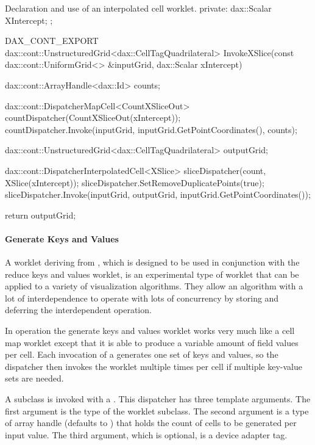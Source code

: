 \begin{daxexample}{Declaration and use of an interpolated cell worklet.}
{private:
  dax::Scalar XIntercept;
};

DAX_CONT_EXPORT
dax::cont::UnstructuredGrid<dax::CellTagQuadrilateral>
InvokeXSlice(const dax::cont::UniformGrid<> &inputGrid, dax::Scalar xIntercept)
{
  dax::cont::ArrayHandle<dax::Id> counts;

  dax::cont::DispatcherMapCell<CountXSliceOut> countDispatcher(CountXSliceOut(xIntercept));
  countDispatcher.Invoke(inputGrid, inputGrid.GetPointCoordinates(), counts);

  dax::cont::UnstructuredGrid<dax::CellTagQuadrilateral> outputGrid;

  dax::cont::DispatcherInterpolatedCell<XSlice> sliceDispatcher(count, XSlice(xIntercept));
  sliceDispatcher.SetRemoveDuplicatePoints(true);
  sliceDispatcher.Invoke(inputGrid, outputGrid, inputGrid.GetPointCoordinates());

  return outputGrid;
}
\end{daxexample}


\paragraph{Generate Keys and Values}


A worklet deriving from , which is
designed to be used in conjunction with the reduce keys and values worklet,
is an experimental type of worklet that can be applied to a variety of
visualization algorithms. They allow an algorithm with a lot of
interdependence to operate with lots of concurrency by storing and
deferring the interdependent operation.

In operation the generate keys and values worklet works very much like a
cell map worklet except that it is able to produce a variable amount of
field values per cell. Each invocation of a
 generates one set of keys and values,
so the dispatcher then invokes the worklet multiple times per cell if
multiple key-value sets are needed.

A  subclass is invoked with a
. This dispatcher has three template
arguments. The first argument is the type of the worklet subclass. The
second argument is a type of array handle (defaults to
\textcode{<}\textcode{>}) that holds the count
of cells to be generated per input value. The third argument, which is
optional, is a device adapter tag.


